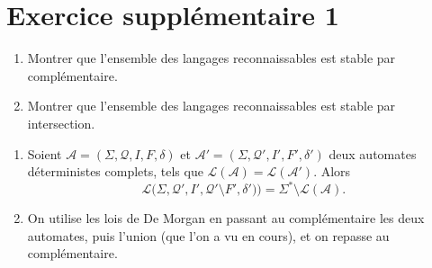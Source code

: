 \section{Exercice supplémentaire 1}

\slshape
\begin{enumerate}
	\item Montrer que l'ensemble des langages reconnaissables est stable par complémentaire.
	\item Montrer que l'ensemble des langages reconnaissables est stable par intersection.
\end{enumerate}
\upshape

\begin{enumerate}
	\item Soient $\mathcal{A} = (\Sigma, \mathcal{Q}, I, F, \delta)$\/ et $\mathcal{A}' = (\Sigma, \mathcal{Q}', I', F', \delta')$\/ deux automates déterministes complets, tels que $\mathcal{L}(\mathcal{A}) = \mathcal{L}(\mathcal{A}')$. Alors \[
		\mathcal{L}\big(\Sigma, \mathcal{Q}', I', \mathcal{Q}'\setminus F', \delta')\big) = \Sigma^* \setminus \mathcal{L}(\mathcal{A})
	.\]
	\item On utilise les lois de {\sc De Morgan}\/ en passant au complémentaire les deux automates, puis l'union (que l'on a vu en cours), et on repasse au complémentaire.
\end{enumerate}




